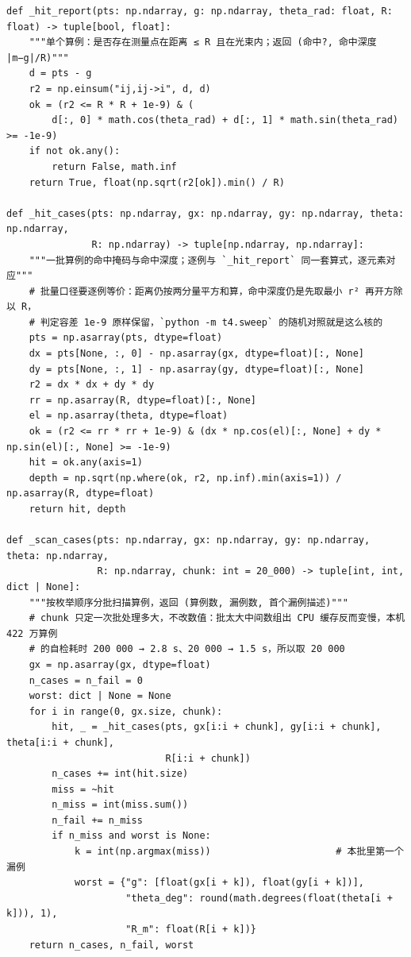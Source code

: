 \documentclass[UTF8, zihao=5,AutoFakeBold=2]{ctexart}
\begin{document}
\begin{lstlisting}
def _hit_report(pts: np.ndarray, g: np.ndarray, theta_rad: float, R: float) -> tuple[bool, float]:
    """单个算例：是否存在测量点在距离 ≤ R 且在光束内；返回 (命中?, 命中深度 |m−g|/R)"""
    d = pts - g
    r2 = np.einsum("ij,ij->i", d, d)
    ok = (r2 <= R * R + 1e-9) & (
        d[:, 0] * math.cos(theta_rad) + d[:, 1] * math.sin(theta_rad) >= -1e-9)
    if not ok.any():
        return False, math.inf
    return True, float(np.sqrt(r2[ok]).min() / R)

def _hit_cases(pts: np.ndarray, gx: np.ndarray, gy: np.ndarray, theta: np.ndarray,
               R: np.ndarray) -> tuple[np.ndarray, np.ndarray]:
    """一批算例的命中掩码与命中深度；逐例与 `_hit_report` 同一套算式，逐元素对应"""
    # 批量口径要逐例等价：距离仍按两分量平方和算，命中深度仍是先取最小 r² 再开方除以 R，
    # 判定容差 1e-9 原样保留，`python -m t4.sweep` 的随机对照就是这么核的
    pts = np.asarray(pts, dtype=float)
    dx = pts[None, :, 0] - np.asarray(gx, dtype=float)[:, None]
    dy = pts[None, :, 1] - np.asarray(gy, dtype=float)[:, None]
    r2 = dx * dx + dy * dy
    rr = np.asarray(R, dtype=float)[:, None]
    el = np.asarray(theta, dtype=float)
    ok = (r2 <= rr * rr + 1e-9) & (dx * np.cos(el)[:, None] + dy * np.sin(el)[:, None] >= -1e-9)
    hit = ok.any(axis=1)
    depth = np.sqrt(np.where(ok, r2, np.inf).min(axis=1)) / np.asarray(R, dtype=float)
    return hit, depth

def _scan_cases(pts: np.ndarray, gx: np.ndarray, gy: np.ndarray, theta: np.ndarray,
                R: np.ndarray, chunk: int = 20_000) -> tuple[int, int, dict | None]:
    """按枚举顺序分批扫描算例，返回 (算例数, 漏例数, 首个漏例描述)"""
    # chunk 只定一次批处理多大，不改数值：批太大中间数组出 CPU 缓存反而变慢，本机 422 万算例
    # 的自检耗时 200 000 → 2.8 s、20 000 → 1.5 s，所以取 20 000
    gx = np.asarray(gx, dtype=float)
    n_cases = n_fail = 0
    worst: dict | None = None
    for i in range(0, gx.size, chunk):
        hit, _ = _hit_cases(pts, gx[i:i + chunk], gy[i:i + chunk], theta[i:i + chunk],
                            R[i:i + chunk])
        n_cases += int(hit.size)
        miss = ~hit
        n_miss = int(miss.sum())
        n_fail += n_miss
        if n_miss and worst is None:
            k = int(np.argmax(miss))                      # 本批里第一个漏例
            worst = {"g": [float(gx[i + k]), float(gy[i + k])],
                     "theta_deg": round(math.degrees(float(theta[i + k])), 1),
                     "R_m": float(R[i + k])}
    return n_cases, n_fail, worst


\end{lstlisting}
\end{document}
